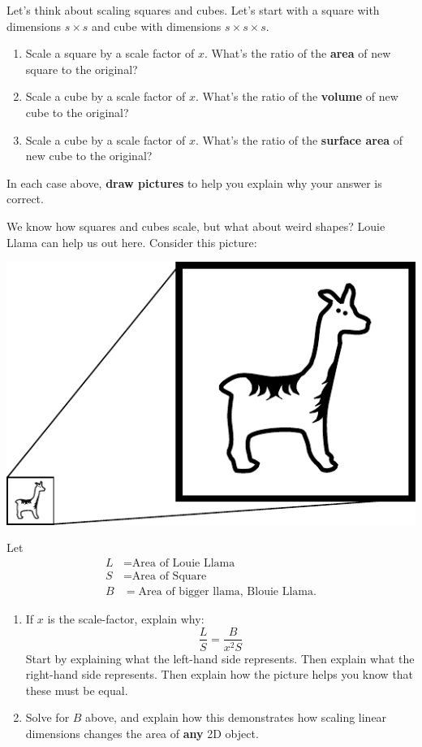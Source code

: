 \documentclass[handout,nooutcomes,noauthor,hints,12pt]{ximera}
\begin{document}
\begin{question}
  Let's think about scaling squares and cubes. Let's start with a
  square with dimensions $s\times s$ and cube with dimensions $s\times
  s\times s$.
  \begin{enumerate}
  \item Scale a square by a scale factor of $x$. What's the ratio of the \textbf{area} of new square to the original?
  \item Scale a cube by a scale factor of $x$. What's the ratio of the \textbf{volume} of new cube to the original?
  \item Scale a cube by a scale factor of $x$. What's the ratio of the \textbf{surface area} of new cube to the original?
  \end{enumerate}
  In each case above, \textbf{draw pictures} to help you explain why your
  answer is correct.
\end{question}
\mynewpage

\begin{question}
  We know how squares and cubes scale, but what about weird shapes?
  Louie Llama can help us out here.  Consider this picture:
  \begin{center}
    \includegraphics{llamaScaled.pdf}
  \end{center}
  Let
  \begin{align*}
    L &= \text{Area of Louie Llama}\\
    S &= \text{Area of Square}\\
    B &= \text{Area of bigger llama, Blouie Llama}.
  \end{align*}
  \begin{enumerate}
  \item If $x$ is the scale-factor, explain why:
    \[
    \frac{L}{S} = \frac{B}{x^2 S}
    \]
    Start by explaining what the left-hand side represents. Then
    explain what the right-hand side represents. Then explain how the
    picture helps you know that these must be equal.
  \item Solve for $B$ above, and explain how this demonstrates how
    scaling linear dimensions changes the area of \textbf{any} 2D object.
  \end{enumerate}
  
\end{question}
\end{document}
